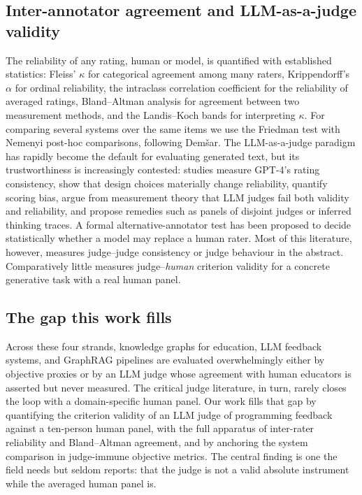 \documentclass[sageh]{sagej}
\begin{document}
\subsection{Inter-annotator agreement and LLM-as-a-judge validity}
The reliability of any rating, human or model, is quantified with established statistics: Fleiss' $\kappa$ for categorical agreement among many raters,\cite{fleiss1971kappa} Krippendorff's $\alpha$ for ordinal reliability,\cite{krippendorff2018content,marzi2024kalpha} the intraclass correlation coefficient for the reliability of averaged ratings,\cite{shrout1979icc,mcgraw1996icc} Bland--Altman analysis for agreement between two measurement methods,\cite{bland1986agreement} and the Landis--Koch bands for interpreting $\kappa$.\cite{landis1977agreement} For comparing several systems over the same items we use the Friedman test with Nemenyi post-hoc comparisons, following Dem\v{s}ar.\cite{demsar2006comparisons} The LLM-as-a-judge paradigm\cite{zheng2023judging,li2024judges} has rapidly become the default for evaluating generated text, but its trustworthiness is increasingly contested: studies measure GPT-4's rating consistency,\cite{hackl2023gpt4} show that design choices materially change reliability,\cite{yamauchi2025judge} quantify scoring bias,\cite{li2025scoringbias} argue from measurement theory that LLM judges fail both validity and reliability,\cite{chehbouni2025neither} and propose remedies such as panels of disjoint judges\cite{verga2024poll} or inferred thinking traces.\cite{zhang2025judge} A formal alternative-annotator test has been proposed to decide statistically whether a model may replace a human rater.\cite{calderon2025alttest} Most of this literature, however, measures judge--judge consistency or judge behaviour in the abstract. Comparatively little measures judge--\emph{human} criterion validity for a concrete generative task with a real human panel.

\subsection{The gap this work fills}
Across these four strands, knowledge graphs for education, LLM feedback systems, and GraphRAG pipelines are evaluated overwhelmingly either by objective proxies or by an LLM judge whose agreement with human educators is asserted but never measured. The critical judge literature, in turn, rarely closes the loop with a domain-specific human panel. Our work fills that gap by quantifying the criterion validity of an LLM judge of programming feedback against a ten-person human panel, with the full apparatus of inter-rater reliability and Bland--Altman agreement, and by anchoring the system comparison in judge-immune objective metrics. The central finding is one the field needs but seldom reports: that the judge is not a valid absolute instrument while the averaged human panel is.
\end{document}
